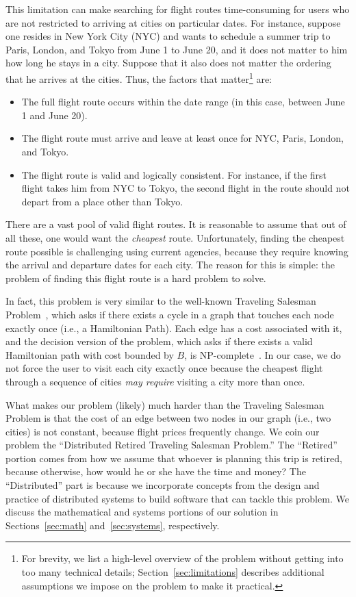\documentclass{article}
\begin{document}
This limitation can make searching for flight routes time-consuming for users who are not restricted to arriving at cities on particular dates. For
instance, suppose one resides in New York City (NYC) and wants to schedule a summer trip to Paris, London, and Tokyo from June 1 to June 20, and it
does not matter to him how long he stays in a city. Suppose that it also does not matter the ordering that he arrives at the cities. Thus, the factors
that matter\footnote{For brevity, we list a high-level overview of the problem without getting into too many technical details;
Section~\ref{sec:limitations} describes additional assumptions we impose on the problem to make it practical.} are:

\begin{itemize}
    \item The full flight route occurs within the date range (in this case, between June 1 and June 20).
    \item The flight route must arrive and leave at least once for NYC, Paris, London, and Tokyo.
    \item The flight route is valid and logically consistent. For instance, if the first flight takes him from NYC to Tokyo, the second flight in the
    route should not depart from a place other than Tokyo.
\end{itemize}

There are a vast pool of valid flight routes. It is reasonable to assume that out of all these, one would want the \emph{cheapest} route.
Unfortunately, finding the cheapest route possible is challenging using current agencies, because they require knowing the arrival and departure dates
for each city. The reason for this is simple: the problem of finding this flight route is a hard problem to solve.

In fact, this problem is very similar to the well-known Traveling Salesman Problem~\cite{Applegate:2007:TSP:1374811}, which asks if there exists a
cycle in a graph that touches each node exactly once (i.e., a Hamiltonian Path). Each edge has a cost associated with it, and the decision version of
the problem, which asks if there exists a valid Hamiltonian path with cost bounded by $B$, is NP-complete~\cite{Kar72}. In our case, we do not force
the user to visit each city exactly once because the cheapest flight through a sequence of cities \emph{may require} visiting a city more than once.

What makes our problem (likely) much harder than the Traveling Salesman Problem is that the cost of an edge between two nodes in our graph (i.e., two
cities) is not constant, because flight prices frequently change. We coin our problem the ``Distributed Retired Traveling Salesman Problem.'' The
``Retired'' portion comes from how we assume that whoever is planning this trip is retired, because otherwise, how would he or she have the time and
money? The ``Distributed'' part is because we incorporate concepts from the design and practice of distributed systems to build software that can
tackle this problem. We discuss the mathematical and systems portions of our solution in Sections~\ref{sec:math} and~\ref{sec:systems}, respectively.
\end{document}
